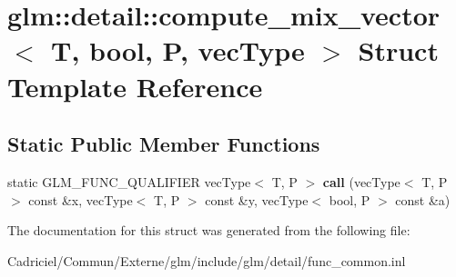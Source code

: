 \hypertarget{structglm_1_1detail_1_1compute__mix__vector_3_01_t_00_01bool_00_01_p_00_01vec_type_01_4}{}\section{glm\+:\+:detail\+:\+:compute\+\_\+mix\+\_\+vector$<$ T, bool, P, vec\+Type $>$ Struct Template Reference}
\label{structglm_1_1detail_1_1compute__mix__vector_3_01_t_00_01bool_00_01_p_00_01vec_type_01_4}
\subsection*{Static Public Member Functions}
\begin{DoxyCompactItemize}
\item 
static G\+L\+M\+\_\+\+F\+U\+N\+C\+\_\+\+Q\+U\+A\+L\+I\+F\+I\+ER vec\+Type$<$ T, P $>$ {\bfseries call} (vec\+Type$<$ T, P $>$ const \&x, vec\+Type$<$ T, P $>$ const \&y, vec\+Type$<$ bool, P $>$ const \&a)\hypertarget{structglm_1_1detail_1_1compute__mix__vector_3_01_t_00_01bool_00_01_p_00_01vec_type_01_4_a8c1f32466902b61e306585f11d903212}{}\label{structglm_1_1detail_1_1compute__mix__vector_3_01_t_00_01bool_00_01_p_00_01vec_type_01_4_a8c1f32466902b61e306585f11d903212}

\end{DoxyCompactItemize}


The documentation for this struct was generated from the following file\+:\begin{DoxyCompactItemize}
\item 
Cadriciel/\+Commun/\+Externe/glm/include/glm/detail/func\+\_\+common.\+inl\end{DoxyCompactItemize}
